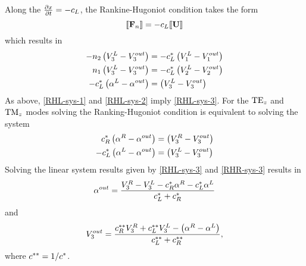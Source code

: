 Along the $\frac{\partial x}{\partial t} = - c_{L}$, the Rankine-Hugoniot condition
takes the form
$$
\llbracket  \mathbf{F}_n  \rrbracket = - c_{L} \llbracket  \mathbf{U}  \rrbracket
$$
which results in
\begin{align}
-n_2 \left(V_3^{L} - V_3^{out} \right) &= - c^{*}_L \left( V_1^{L} - V_1^{out} \right) \label{RHL-sys-1} \\
n_1 \left(V_3^{L} - V_3^{out} \right) &= - c^{*}_L  \left( V_2^{L} - V_2^{out} \right) \label{RHL-sys-2} \\
- c^{*}_L \left( \alpha^{L} - \alpha^{out} \right) &= \left( V_3^{L} - V_3^{out} \right) \label{RHL-sys-3}
\end{align}
As above, \eqref{RHL-sys-1} and \eqref{RHL-sys-2} imply \eqref{RHL-sys-3}.
For the $\textrm{TE}_{z}$ and $\textrm{TM}_{z}$ modes solving the Ranking-Hugoniot condition is equivalent to solving the system
\begin{align}
c^{*}_R \left(\alpha^{R} - \alpha^{out} \right) &= \left( V_3^{R} - V_3^{out} \right) \\
- c^{*}_L \left( \alpha^{L} - \alpha^{out} \right) &= \left( V_3^{L} - V_3^{out} \right)
\end{align}
Solving the linear system results given by \eqref{RHL-sys-3} and
\eqref{RHR-sys-3} results in
\begin{equation}
\alpha^{out} = \frac{V_3^R - V_3^L - c^{*}_R \alpha^R - c^{*}_L \alpha^L}{c^{*}_L + c^{*}_R}\label{eq:interfce-bc-alphaGeneral}
\end{equation}
and
\begin{equation}
  V_3^{out} =
  \frac{
    c^{**}_R V_3^R + c^{**}_L V_3^L - \left(\alpha^R - \alpha^L \right)
  }{
    c^{**}_L + c^{**}_R
    } , \label{eq:interface-bc-V3}
\end{equation}
where $c^{**} = 1 / c^{*}$.

